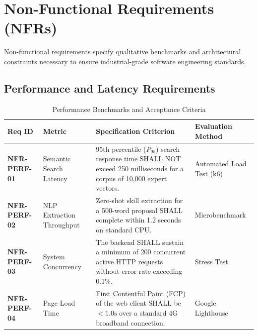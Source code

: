 \documentclass[11pt,a4paper]{article}
\begin{document}
\clearpage
\section{Non-Functional Requirements (NFRs)}
\label{sec:nfrs}

Non-functional requirements specify qualitative benchmarks and architectural constraints necessary to ensure industrial-grade software engineering standards.

\subsection{Performance and Latency Requirements}
\begin{table}[H]
\centering
\small
\caption{Performance Benchmarks and Acceptance Criteria}
\label{tab:perf_nfr}
\begin{tabularx}{\textwidth}{@{}l p{3.2cm} X l@{}}
\toprule
\textbf{Req ID} & \textbf{Metric} & \textbf{Specification Criterion} & \textbf{Evaluation Method} \\
\midrule
\textbf{NFR-PERF-01} & Semantic Search Latency & 95th percentile ($P_{95}$) search response time SHALL NOT exceed 250 milliseconds for a corpus of 10,000 expert vectors. & Automated Load Test (k6) \\
\addlinespace
\textbf{NFR-PERF-02} & NLP Extraction Throughput & Zero-shot skill extraction for a 500-word proposal SHALL complete within 1.2 seconds on standard CPU. & Microbenchmark \\
\addlinespace
\textbf{NFR-PERF-03} & System Concurrency & The backend SHALL sustain a minimum of 200 concurrent active HTTP requests without error rate exceeding 0.1\%. & Stress Test \\
\addlinespace
\textbf{NFR-PERF-04} & Page Load Time & First Contentful Paint (FCP) of the web client SHALL be $< 1.0\text{s}$ over a standard 4G broadband connection. & Google Lighthouse \\
\bottomrule
\end{tabularx}
\end{table}
\end{document}
